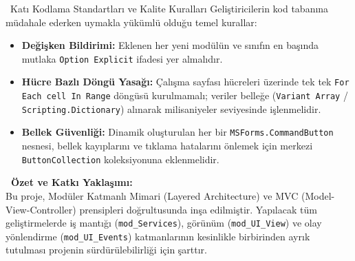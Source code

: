 \vspace{0.3cm}

\begin{warningbox}{\faExclamationTriangle\ Katı Kodlama Standartları ve Kalite Kuralları}
Geliştiricilerin kod tabanına müdahale ederken uymakla yükümlü olduğu temel kurallar:
\begin{itemize}\setlength{\itemsep}{2pt}
    \item \textbf{Değişken Bildirimi:} Eklenen her yeni modülün ve sınıfın en başında mutlaka \texttt{Option Explicit} ifadesi yer almalıdır.
    \item \textbf{Hücre Bazlı Döngü Yasağı:} Çalışma sayfası hücreleri üzerinde tek tek \texttt{For Each cell In Range} döngüsü kurulmamalı; veriler belleğe (\texttt{Variant Array} / \texttt{Scripting.Dictionary}) alınarak milisaniyeler seviyesinde işlenmelidir.
    \item \textbf{Bellek Güvenliği:} Dinamik oluşturulan her bir \texttt{MSForms.CommandButton} nesnesi, bellek kayıplarını ve tıklama hatalarını önlemek için merkezi \texttt{ButtonCollection} koleksiyonuna eklenmelidir.
\end{itemize}
\end{warningbox}

\vspace{0.3cm}

\begin{tcolorbox}[colback=yellow!15,colframe=orange!80!black,leftrule=3.5pt,boxrule=0.4pt,top=5pt,bottom=5pt]
    \textbf{\textcolor{orange!80!black}{\faInfoCircle\ Özet ve Katkı Yaklaşımı:}}\\
    \small Bu proje, Modüler Katmanlı Mimari (Layered Architecture) ve MVC (Model-View-Controller) prensipleri doğrultusunda inşa edilmiştir. Yapılacak tüm geliştirmelerde iş mantığı (\texttt{mod\_Services}), görünüm (\texttt{mod\_UI\_View}) ve olay yönlendirme (\texttt{mod\_UI\_Events}) katmanlarının kesinlikle birbirinden ayrık tutulması projenin sürdürülebilirliği için şarttır.
\end{tcolorbox}